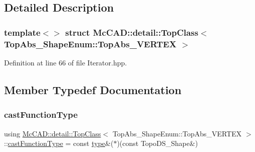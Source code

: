 \subsection{Detailed Description}
\subsubsection*{template$<$$>$\newline
struct Mc\+C\+A\+D\+::detail\+::\+Top\+Class$<$ Top\+Abs\+\_\+\+Shape\+Enum\+::\+Top\+Abs\+\_\+\+V\+E\+R\+T\+E\+X $>$}



Definition at line 66 of file Iterator.\+hpp.



\subsection{Member Typedef Documentation}
\mbox{\label{structMcCAD_1_1detail_1_1TopClass_3_01TopAbs__ShapeEnum_1_1TopAbs__VERTEX_01_4_a5a1721f062076980de404b50886a4a90}} 
\subsubsection{\texorpdfstring{cast\+Function\+Type}{castFunctionType}}
{\footnotesize\ttfamily using \hyperlink{structMcCAD_1_1detail_1_1TopClass}{Mc\+C\+A\+D\+::detail\+::\+Top\+Class}$<$ Top\+Abs\+\_\+\+Shape\+Enum\+::\+Top\+Abs\+\_\+\+V\+E\+R\+T\+EX $>$\+::\hyperlink{structMcCAD_1_1detail_1_1TopClass_3_01TopAbs__ShapeEnum_1_1TopAbs__VERTEX_01_4_a5a1721f062076980de404b50886a4a90}{cast\+Function\+Type} =  const \hyperlink{structMcCAD_1_1detail_1_1TopClass_3_01TopAbs__ShapeEnum_1_1TopAbs__VERTEX_01_4_aac4ac574e4238dedde2ba199faa49518}{type}\&($\ast$)(const Topo\+D\+S\+\_\+\+Shape\&)}



